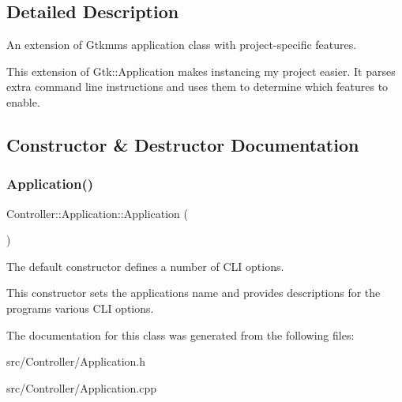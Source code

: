 \subsection{Detailed Description}
An extension of Gtkmm\textquotesingle{}s application class with project-\/specific features. 

This extension of Gtk\+::\+Application makes instancing my project easier. It parses extra command line instructions and uses them to determine which features to enable. 

\subsection{Constructor \& Destructor Documentation}
\mbox{\label{classController_1_1Application_ab80e09311c2402c2fa81c70de598f521}} 
\subsubsection{\texorpdfstring{Application()}{Application()}}
{\footnotesize\ttfamily Controller\+::\+Application\+::\+Application (\begin{DoxyParamCaption}{ }\end{DoxyParamCaption})}



The default constructor defines a number of C\+LI options. 

This constructor sets the application\textquotesingle{}s name and provides descriptions for the program\textquotesingle{}s various C\+LI options. 

The documentation for this class was generated from the following files\+:\begin{DoxyCompactItemize}
\item 
src/\+Controller/Application.\+h\item 
src/\+Controller/Application.\+cpp\end{DoxyCompactItemize}
